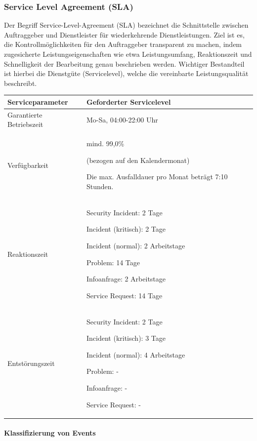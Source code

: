 \documentclass[]{article}
\let\oldparagraph\paragraph
\renewcommand{\paragraph}[1]{\oldparagraph{#1}\mbox{}}
\begin{document}
\subsubsection{\texorpdfstring{\protect\hypertarget{ux5fRef456699502}{}{\protect\hypertarget{ux5fToc457467702}{}{}}Service
Level Agreement
(SLA)}{Service Level Agreement (SLA)}}\label{service-level-agreement-sla}

Der Begriff Service-Level-Agreement (SLA) bezeichnet die Schnittstelle
zwischen Auftraggeber und Dienstleister für wiederkehrende
Dienstleistungen. Ziel ist es, die Kontrollmöglichkeiten für den
Auftraggeber transparent zu machen, indem zugesicherte
Leistungseigenschaften wie etwa Leistungsumfang, Reaktionszeit und
Schnelligkeit der Bearbeitung genau beschrieben werden. Wichtiger
Bestandteil ist hierbei die Dienstgüte (Servicelevel), welche die
vereinbarte Leistungsqualität beschreibt.

\begin{longtable}{lp{6cm}}
\toprule
Serviceparameter & Geforderter Servicelevel\tabularnewline
\midrule
\protect\hypertarget{GarantierteBetriebszeit}{}{}Garantierte
Betriebszeit & Mo-Sa, 04:00-22:00 Uhr\tabularnewline
Verfügbarkeit & mind. 99,0\%

(bezogen auf den Kalendermonat)

Die max. Ausfalldauer pro Monat beträgt 7:10 Stunden.\tabularnewline
Reaktionszeit & Security Incident: 2 Tage

Incident (kritisch): 2 Tage

Incident (normal): 2 Arbeitstage

Problem: 14 Tage

Infoanfrage: 2 Arbeitstage

Service Request: 14 Tage\tabularnewline
Entstörungszeit & Security Incident: 2 Tage

Incident (kritisch): 3 Tage

Incident (normal): 4 Arbeitstage

Problem: -

Infoanfrage: -

Service Request: -\tabularnewline
\bottomrule
\end{longtable}

\paragraph{Klassifizierung von Events}\label{klassifizierung-von-events}
\end{document}

